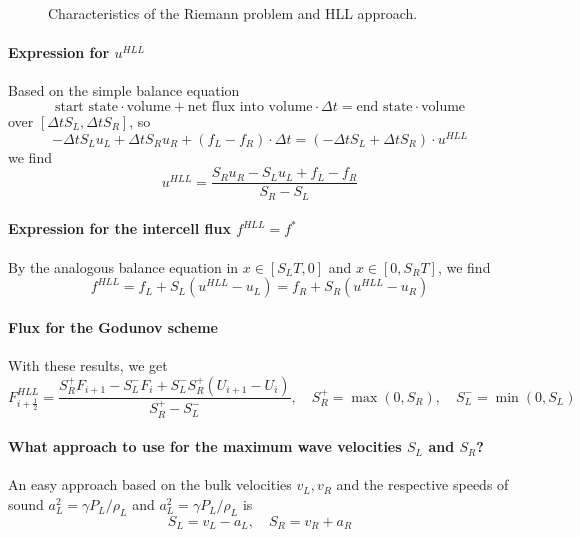 \begin{figure}[htb!]
    \centering
    
    \caption{Characteristics of the Riemann problem and HLL approach.}
    \label{fig:char_hll_s}
\end{figure}

\paragraph*{Expression for $u^{HLL}$} Based on the simple balance equation
\begin{equation}
    \text{start state} \cdot \text{volume} + \text{net flux into volume} \cdot \Delta t = \text{end state} \cdot \text{volume}
\end{equation}
over $[\Delta t S_L,\Delta t S_R]$, so
\begin{equation}
    - \Delta t S_L u_L + \Delta t S_R u_R + (f_L - f_R) \cdot \Delta t = (- \Delta t S_L + \Delta t S_R) \cdot u^{HLL}
\end{equation}
we find
\begin{equation}
    u^{H L L}=\frac{S_R u_R-S_L u_L+f_L-f_R}{S_R-S_L}
\end{equation}

\paragraph*{Expression for the intercell flux $f^{HLL} = f^*$}
By the analogous balance equation in $x \in [S_L T,0]$ and $x \in [0,S_R T]$,
we find
\begin{equation}
    f^{H L L}=f_L+S_L\left(u^{H L L}-u_L\right)=f_R+S_R\left(u^{H L L}-u_R\right)
\end{equation}

\paragraph*{Flux for the Godunov scheme}
With these results, we get
\begin{equation}
    F_{i+\frac{1}{2}}^{H L L}=\frac{S_R^+ F_{i+1}-S_L^- F_i+S_L^- S_R^+\left(U_{i+1}-U_i\right)}{S_R^+-S_L^-}, \quad S_R^+ = \max(0, S_R), \quad S_L^- = \min(0, S_L)
\end{equation}

\paragraph*{What approach to use for the maximum wave velocities $S_L$ and $S_R$?}
An easy approach based on the bulk velocities $v_L,v_R$ and the respective speeds
of sound $a_L^2 = \gamma P_L \slash \rho_L$ and $a_L^2 = \gamma P_L \slash \rho_L$
is
\begin{equation}
    S_L = v_L - a_L, \quad S_R = v_R + a_R
\end{equation}

